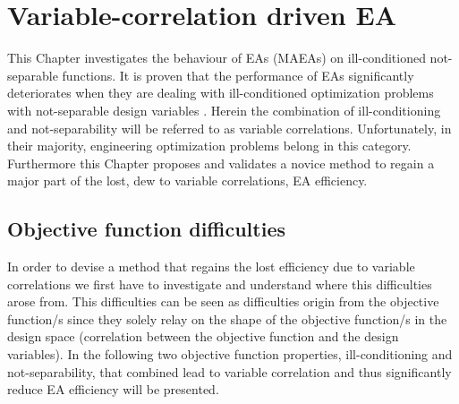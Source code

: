 \ifpdf
    \graphicspath{{4/figures/PNG/}{4/figures/PDF/}{3/figures/}}
\else
    \graphicspath{{4/figures/EPS/}{4/figures/}}
\fi

\chapter{Variable-correlation driven EA} %

This Chapter investigates the behaviour of EAs (MAEAs) on ill-conditioned not-separable functions. It is proven that the performance of EAs significantly deteriorates when they are dealing with ill-conditioned optimization problems with not-separable design variables \cite{Salomon,Roy_2002a,Ghisu_2010}. Herein the combination of ill-conditioning and not-separability will be referred to as variable correlations. Unfortunately, in their majority, engineering optimization problems belong in this category. Furthermore this Chapter proposes and validates a novice method to regain a major part of the lost, dew to variable correlations, EA efficiency.  

\section{Objective function difficulties}
In order to devise a method that regains the lost efficiency due to variable correlations we first have to investigate and understand where this difficulties arose from. This difficulties can be seen as difficulties origin from the objective function/s since they solely relay on the shape of the objective function/s in the design space (correlation between the objective function and the design variables). In the following two objective function properties, ill-conditioning and not-separability, that combined lead to variable correlation and thus significantly reduce EA efficiency will be presented.

